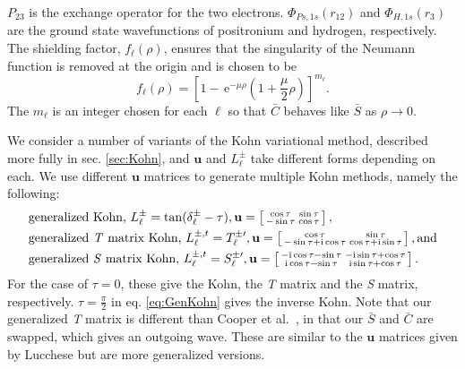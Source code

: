 \documentclass[preprint,showpacs,preprintnumbers,amsmath,amssymb]{revtex4}
\newcommand{\ee} {\,\text{e}}
\newcommand{\ii}{{\rm{i}}}
\begin{document}
$P_{23}$ is the exchange operator for the two electrons. $\Phi_{Ps,1s}\left(r_{12}\right)$ and $\Phi_{H,1s}\left(r_3\right)$ are the ground state wavefunctions of positronium and hydrogen, respectively. The shielding factor, $f_\ell(\rho)$, ensures that the singularity of the Neumann function is removed at the origin and is chosen to be
\begin{equation}
f_\ell(\rho) = \left[1 - \ee^{-\mu \rho} \left(1+\frac{\mu}{2}\rho\right)\right]^{m_\ell}.
\label{eq:PartialWaveShielding}
\end{equation}
The $m_\ell$ is an integer chosen for each $\ell$ so that $\bar{C}$ behaves like $\bar{S}$ as $\rho \rightarrow 0$.

We consider a number of variants of the Kohn variational method, described more fully in sec. \ref{sec:Kohn}, and $\textbf{u}$ and $L^{\pm}_\ell$ take different forms depending on each. We use different $\textbf{u}$ matrices to generate multiple Kohn methods, namely the following:
\begin{subequations}
\begin{align}
&\text{generalized Kohn, } L^{\pm}_\ell = \tan(\delta^{\pm}_\ell-\tau), \textbf{u} = \left[ \begin{smallmatrix}
\cos \tau & \sin \tau \\  -\sin \tau & \cos \tau
\end{smallmatrix} \right], \label{eq:GenKohn}\\
&\text{generalized \emph{T} matrix Kohn, } L^{\pm,t}_\ell = T_\ell^{\pm\prime}, \textbf{u} = \left[ \begin{smallmatrix}
\cos\tau & \sin\tau \\ -\sin\tau + \ii \cos\tau & \cos\tau + \ii \sin\tau
\end{smallmatrix} \right], \text{and}\label{eq:GenTKohn} \\
&\text{generalized \emph{S} matrix Kohn, } L^{\pm,t}_\ell = S_\ell^{\pm\prime}, \textbf{u} = \left[ \begin{smallmatrix}
-\ii \cos\tau - \sin\tau & -\ii\sin\tau + \cos\tau \\ \ii\cos\tau - \sin\tau & \ii\sin\tau + \cos\tau
\end{smallmatrix} \right]. \label{eq:GenSKohn}
\end{align}
\end{subequations}
For the case of $\tau = 0$, these give the Kohn, the \emph{T} matrix and the \emph{S} matrix, respectively. $\tau = \frac{\pi}{2}$ in eq. \ref{eq:GenKohn} gives the inverse Kohn. Note that our generalized \emph{T} matrix is different than Cooper et al.\ \cite{Cooper2010}, in that our $\bar{S}$ and $\bar{C}$ are swapped, which gives an outgoing wave. These are similar to the $\textbf{u}$ matrices given by Lucchese \cite{Lucchese1989} but are more generalized versions.
\end{document}
